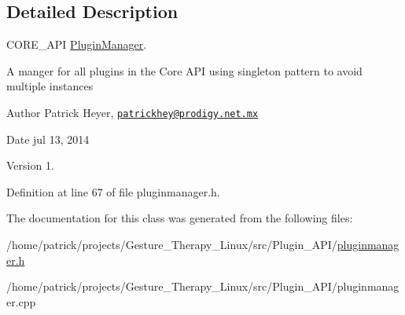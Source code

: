 \subsection{Detailed Description}
C\+O\+R\+E\+\_\+\+A\+PI \hyperlink{class_plugin_manager}{Plugin\+Manager}. 

A manger for all plugins in the Core A\+PI using singleton pattern to avoid multiple instances

\begin{DoxyAuthor}{Author}
Patrick Heyer, \href{mailto:patrickhey@prodigy.net.mx}{\tt patrickhey@prodigy.\+net.\+mx} 
\end{DoxyAuthor}
\begin{DoxyDate}{Date}
jul 13, 2014 
\end{DoxyDate}
\begin{DoxyVersion}{Version}
1. 
\end{DoxyVersion}


Definition at line 67 of file pluginmanager.\+h.



The documentation for this class was generated from the following files\+:\begin{DoxyCompactItemize}
\item 
/home/patrick/projects/\+Gesture\+\_\+\+Therapy\+\_\+\+Linux/src/\+Plugin\+\_\+\+A\+P\+I/\hyperlink{pluginmanager_8h}{pluginmanager.\+h}\item 
/home/patrick/projects/\+Gesture\+\_\+\+Therapy\+\_\+\+Linux/src/\+Plugin\+\_\+\+A\+P\+I/pluginmanager.\+cpp\end{DoxyCompactItemize}
